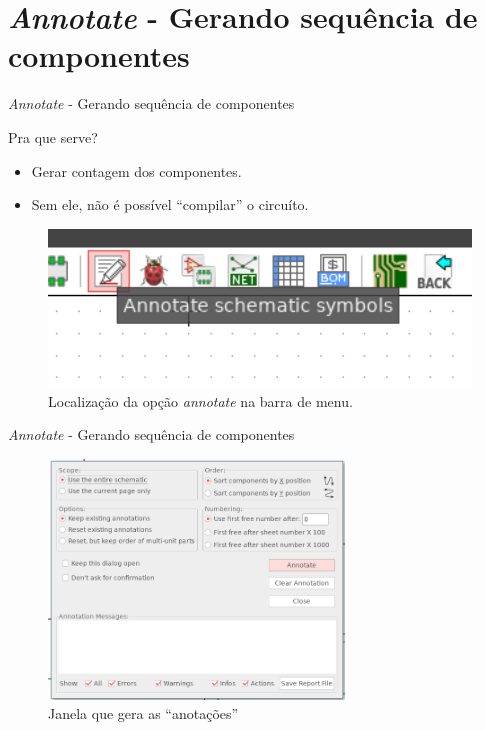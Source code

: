 \documentclass{beamer}
\begin{document}
\section{\textit{Annotate} - Gerando sequência de componentes}
\begin{frame}{\textit{Annotate} - Gerando sequência de componentes}
	\begin{block}{Pra que serve?}
		\begin{itemize}
			\item Gerar contagem dos componentes.
			\item Sem ele, não é possível ``compilar'' o circuíto.
		\end{itemize}
	\end{block}
	\begin{figure}
		\centering
		\includegraphics[width=1.0\textwidth]{Imagens/05_anotate_local.png}
		\caption{Localização da opção \textit{annotate} na barra de menu.}
	\end{figure}
\end{frame}

\begin{frame}{\textit{Annotate} - Gerando sequência de componentes}
	\begin{figure}
		\centering
		\includegraphics[width=0.7\textwidth]{Imagens/06_anotate_janela.png}
		\caption{Janela que gera as ``anotações'' }
	\end{figure}
\end{frame}
\end{document}

